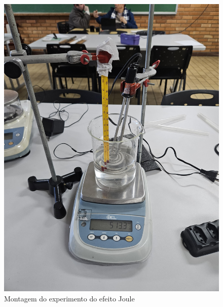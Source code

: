 \documentclass[conference]{IEEEtran}
\begin{document}
\begin{figure}[htbp]
    \centering
    \caption{Montagem do experimento do efeito Joule}
    \label{fig:montagem_aquecimento}
    \includegraphics[width=0.8\linewidth]{figures/montagem_aquecimento.jpeg}
\end{figure}




\end{document}
